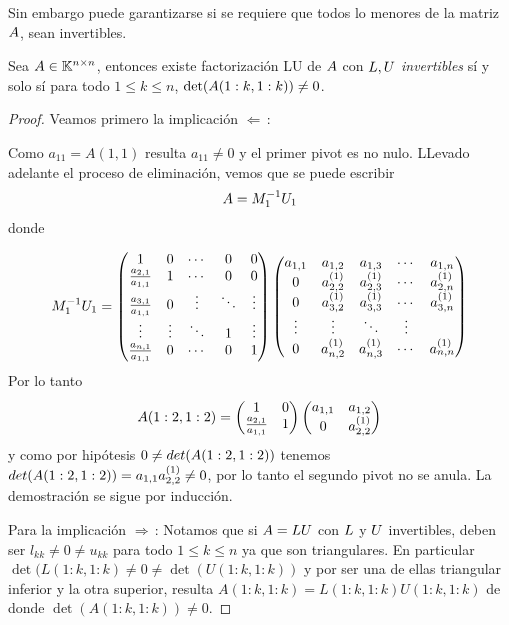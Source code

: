 Sin embargo puede garantizarse si se requiere que todos lo menores de la matriz $\Ab$,
sean invertibles.

\begin{tcolorbox}
[colback=black!15!white,colframe=black!75!black]
\begin{proposicion}\label{prop:menorenonulos}
 Sea $\Ab\in \Knn$, entonces existe factorización LU de $\Ab$ con $\Lb,\Ub$ \emph{invertibles} sí y solo sí
 para todo  $1\le k\le n$,  $\det(\Ab(1:k,1:k))\neq 0$.
\end{proposicion}

\end{tcolorbox}
 \begin{proof} Veamos primero la implicación $\Leftarrow\,$:


 Como $a_{11}=A(1,1)$ resulta $a_{11}\neq 0$ y el primer pivot es no nulo. LLevado adelante el proceso de eliminación, vemos que se puede escribir
$$
\Ab=\Mb_1^{-1}\Ub_1
$$
donde

$$
\Mb_1^{-1}\Ub_1=
\begin{pmatrix}
1 & 0 & \cdots & 0 & 0\\
\frac{a_{2,1}}{a_{1,1}} & 1 & \cdots & 0 & 0 \\
\frac{a_{3,1}}{a_{1,1}} & 0 & \vdots  & \ddots & \vdots  \\
\vdots  & \vdots  & \ddots &1&  \vdots  \\
\frac{a_{n,1}}{a_{1,1}} &  0 & \cdots & 0& 1
\end{pmatrix}\begin{pmatrix}
a_{1,1}& a_{1,2} & a_{1,3} &\cdots & a_{1,n} \\
0 & a^{(1)}_{2,2} & a^{(1)}_{2,3} &\cdots & a^{(1)}_{2,n} \\
0 & a^{(1)}_{3,2} & a^{(1)}_{3,3} & \cdots & a^{(1)}_{3,n} \\

\vdots  & \vdots  & \ddots & \vdots  \\
0 & a^{(1)}_{n,2}& a^{(1)}_{n,3} & \cdots & a^{(1)}_{n,n}
\end{pmatrix}
$$
Por lo tanto
$$
\Ab(1:2,1:2)=\begin{pmatrix}
1 & 0 \\
\frac{a_{2,1}}{a_{1,1}} & 1\\
\end{pmatrix}\begin{pmatrix}
a_{1,1}& a_{1,2} \\
0 & a^{(1)}_{2,2}
\end{pmatrix}
$$
y como por hip\'otesis
$0\neq det(\Ab(1:2,1:2))$ tenemos $det(\Ab(1:2,1:2))=a_{1,1}a_{2,2}^{(1)}\neq 0$, por lo tanto el segundo pivot no se anula. La demostración se sigue por inducción.

Para la implicación $\Rightarrow\,$: Notamos que si $\Ab=\Lb\Ub$ con $\Lb$ y $\Ub$ invertibles, deben ser $l_{kk}\neq 0 \neq u_{kk}$ para todo $1\le k \le n$ ya que son triangulares. En particular $\det(L(1:k,1:k)\neq 0 \neq \det(U(1:k,1:k))$ y por ser  una de ellas triangular inferior y la otra superior, resulta $A(1:k,1:k)=L(1:k,1:k)U(1:k,1:k)$ de donde
$\det(A(1:k,1:k))\neq 0$.
 \end{proof}


